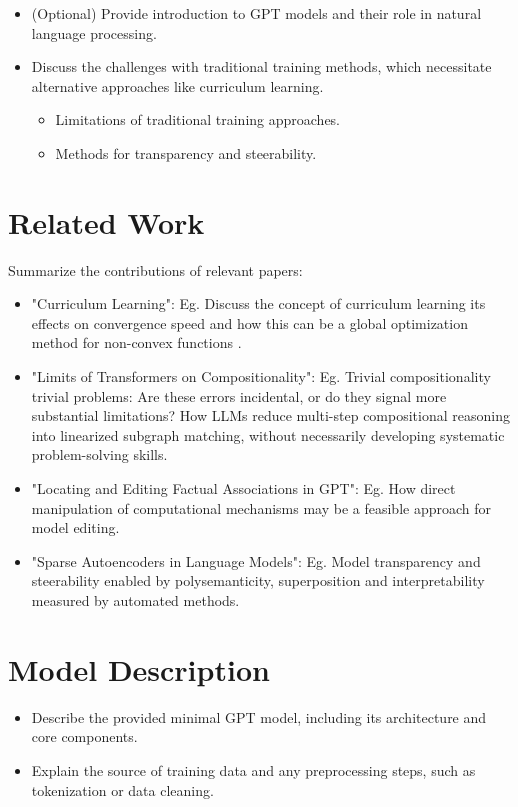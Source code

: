 \documentclass[12pt]{article}
\theoremstyle{plain}
\theoremstyle{definition}
\theoremstyle{remark}
\begin{document}
\begin{itemize}
  \item (Optional) Provide introduction to GPT models and their role in natural language processing.
  \item Discuss the challenges with traditional training methods, which necessitate alternative approaches like curriculum learning.
  \begin{itemize}
    \item Limitations of traditional training approaches.
    \item Methods for transparency and steerability.
  \end{itemize}
\end{itemize}

\section{Related Work}
\label{sec:rel_work}

Summarize the contributions of relevant papers:
\begin{itemize}
  \item \cite{10.1145/1553374.1553380} "Curriculum Learning": Eg. Discuss the concept of curriculum learning its effects on convergence speed and how this can be a global optimization method for non-convex functions .
  \item \cite{dziri2023faith} "Limits of Transformers on Compositionality": Eg. Trivial compositionality trivial problems: Are these errors incidental, or do they signal more substantial limitations? How LLMs reduce multi-step compositional reasoning into linearized subgraph matching, without necessarily developing systematic problem-solving skills.
  \item \cite{meng2023locating} "Locating and Editing Factual Associations in GPT": Eg. How direct manipulation of computational mechanisms may be a feasible approach for model editing.
  \item \cite{cunningham2023sparse} "Sparse Autoencoders in Language Models": Eg. Model transparency and steerability enabled by polysemanticity, superposition and interpretability measured by automated methods.
\end{itemize}

\section{Model Description}
\label{sec:model_desc}

\begin{itemize}
  \item Describe the provided minimal GPT model, including its architecture and core components.
  \item Explain the source of training data and any preprocessing steps, such as tokenization or data cleaning.
\end{itemize}
\end{document}
